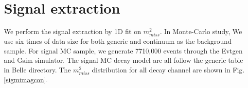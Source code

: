 \section{Signal extraction}
We perform the signal extraction by 1D fit on $m^2_{miss}$. In Monte-Carlo study, We use six times of data size for both generic and continuum as the background sample. For signal MC sample, we generate 7710,000 events through the Evtgen and Gsim simulator. The signal MC decay model are all follow the generic table in Belle directory. The $m^2_{miss}$ distribution for all decay channel are shown in Fig.\ref{sigmimagcon}. 
\begin{figure}[h]
	\centering
\end{figure}
